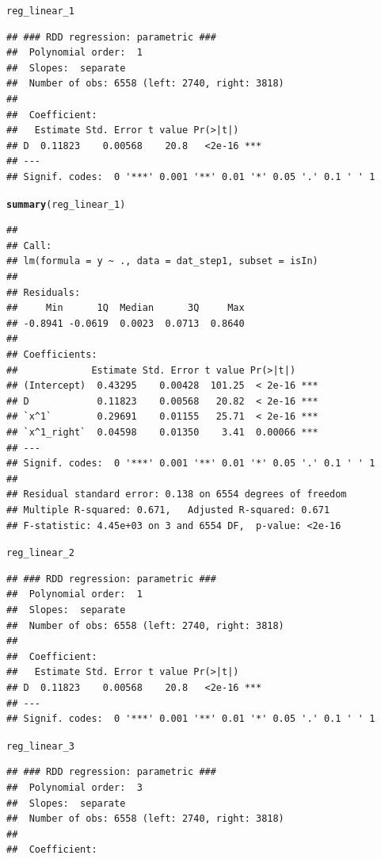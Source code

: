 \documentclass[english,nojss]{jss}\usepackage{graphicx, color}
\makeatletter
\newcommand{\hlfunctioncall}[1]{\textcolor[rgb]{0.501960784313725,0,0.329411764705882}{\textbf{#1}}}%
\newenvironment{kframe}{%
 \def\at@end@of@kframe{}%
 \ifinner\ifhmode%
  \def\at@end@of@kframe{\end{minipage}}%
  \begin{minipage}{\columnwidth}%
 \fi\fi%
 \def\FrameCommand##1{\hskip\@totalleftmargin \hskip-\fboxsep
 \colorbox{shadecolor}{##1}\hskip-\fboxsep
     \hskip-\linewidth \hskip-\@totalleftmargin \hskip\columnwidth}%
 \MakeFramed {\advance\hsize-\width
   \@totalleftmargin\z@ \linewidth\hsize
   \@setminipage}}%
 {\par\unskip\endMakeFramed%
 \at@end@of@kframe}
\newenvironment{knitrout}{}{} %
\makeatother
\begin{document}
\begin{knitrout}
\color{fgcolor}\begin{kframe}
\begin{alltt}
reg_linear_1
\end{alltt}
\begin{verbatim}
## ### RDD regression: parametric ###
## 	Polynomial order:  1 
## 	Slopes:  separate 
## 	Number of obs: 6558 (left: 2740, right: 3818)
## 
## 	Coefficient:
##   Estimate Std. Error t value Pr(>|t|)    
## D  0.11823    0.00568    20.8   <2e-16 ***
## ---
## Signif. codes:  0 '***' 0.001 '**' 0.01 '*' 0.05 '.' 0.1 ' ' 1
\end{verbatim}
\begin{alltt}
\hlfunctioncall{summary}(reg_linear_1)
\end{alltt}
\begin{verbatim}
## 
## Call:
## lm(formula = y ~ ., data = dat_step1, subset = isIn)
## 
## Residuals:
##     Min      1Q  Median      3Q     Max 
## -0.8941 -0.0619  0.0023  0.0713  0.8640 
## 
## Coefficients:
##             Estimate Std. Error t value Pr(>|t|)    
## (Intercept)  0.43295    0.00428  101.25  < 2e-16 ***
## D            0.11823    0.00568   20.82  < 2e-16 ***
## `x^1`        0.29691    0.01155   25.71  < 2e-16 ***
## `x^1_right`  0.04598    0.01350    3.41  0.00066 ***
## ---
## Signif. codes:  0 '***' 0.001 '**' 0.01 '*' 0.05 '.' 0.1 ' ' 1 
## 
## Residual standard error: 0.138 on 6554 degrees of freedom
## Multiple R-squared: 0.671,	Adjusted R-squared: 0.671 
## F-statistic: 4.45e+03 on 3 and 6554 DF,  p-value: <2e-16
\end{verbatim}
\begin{alltt}
reg_linear_2
\end{alltt}
\begin{verbatim}
## ### RDD regression: parametric ###
## 	Polynomial order:  1 
## 	Slopes:  separate 
## 	Number of obs: 6558 (left: 2740, right: 3818)
## 
## 	Coefficient:
##   Estimate Std. Error t value Pr(>|t|)    
## D  0.11823    0.00568    20.8   <2e-16 ***
## ---
## Signif. codes:  0 '***' 0.001 '**' 0.01 '*' 0.05 '.' 0.1 ' ' 1
\end{verbatim}
\begin{alltt}
reg_linear_3
\end{alltt}
\begin{verbatim}
## ### RDD regression: parametric ###
## 	Polynomial order:  3 
## 	Slopes:  separate 
## 	Number of obs: 6558 (left: 2740, right: 3818)
## 
## 	Coefficient:

\end{verbatim}
\end{kframe}
\end{knitrout}
\end{document}
